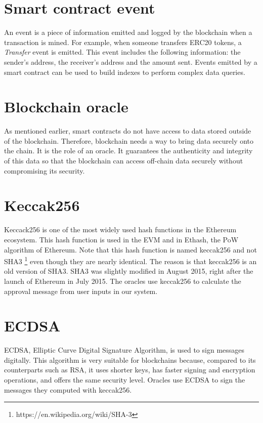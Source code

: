 \documentclass[a4paper,11pt,oneside]{report}
\begin{document}
\section{Smart contract event}
An event is a piece of information emitted and logged by the blockchain when a transaction is mined. For example, when someone transfers ERC20 tokens, a \textit{Transfer} event is emitted. This event includes the following information: the sender's address, the receiver's address and the amount sent. Events emitted by a smart contract can be used to build indexes to perform complex data queries.

\section{Blockchain oracle}
As mentioned earlier, smart contracts do not have access to data stored outside of the blockchain. Therefore, blockchain needs a way to bring data securely onto the chain. It is the role of an oracle. It guarantees the authenticity and integrity of this data so that the blockchain can access off-chain data securely without compromising its security.

\section{Keccak256}
Keccack256 is one of the most widely used hash functions in the Ethereum ecosystem. This hash function is used in the EVM and in Ethash, the PoW algorithm of Ethereum. Note that this hash function is named keccak256 and not SHA3 \footnote{https://en.wikipedia.org/wiki/SHA-3} even though they are nearly identical. The reason is that keccak256 is an old version of SHA3. SHA3 was slightly modified in August 2015, right after the launch of Ethereum in July 2015. The oracles use keccak256 to calculate the approval message from user inputs in our system.

\section{ECDSA}
ECDSA, Elliptic Curve Digital Signature Algorithm, is used to sign messages digitally. This algorithm is very suitable for blockchains because, compared to its counterparts such as RSA, it uses shorter keys, has faster signing and encryption operations, and offers the same security level. Oracles use ECDSA to sign the messages they computed with keccak256.
\end{document}
